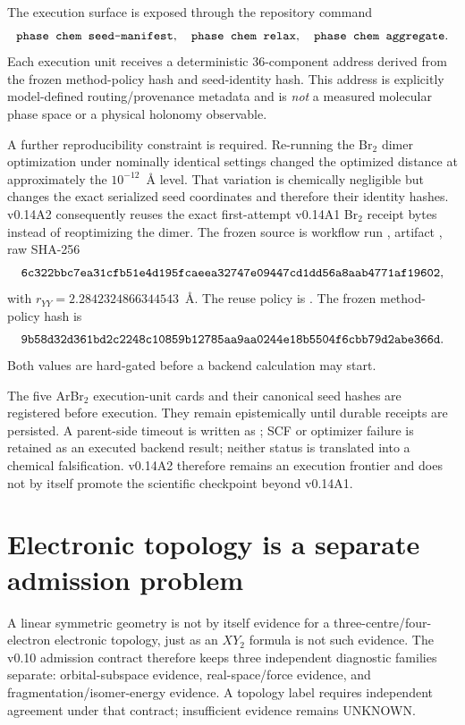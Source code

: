 The execution surface is exposed through the repository command
\begin{equation}
\texttt{phase\ chem\ seed-manifest},\quad
\texttt{phase\ chem\ relax},\quad
\texttt{phase\ chem\ aggregate}.
\end{equation}
Each execution unit receives a deterministic 36-component address derived from the frozen method-policy hash and seed-identity hash.  This address is explicitly model-defined routing/provenance metadata and is \emph{not} a measured molecular phase space or a physical holonomy observable.

A further reproducibility constraint is required.  Re-running the Br$_2$ dimer optimization under nominally identical settings changed the optimized distance at approximately the $10^{-12}$~\AA{} level.  That variation is chemically negligible but changes the exact serialized seed coordinates and therefore their identity hashes.  v0.14A2 consequently reuses the exact first-attempt v0.14A1 Br$_2$ receipt bytes instead of reoptimizing the dimer.  The frozen source is workflow run , artifact , raw  SHA-256
\begin{equation}
\texttt{6c322bbc7ea31cfb51e4d195fcaeea32747e09447cd1dd56a8aab4771af19602},
\end{equation}
with $r_{YY}=2.2842324866344543$~\AA{}.  The reuse policy is .  The frozen method-policy hash is
\begin{equation}
\texttt{9b58d32d361bd2c2248c10859b12785aa9aa0244e18b5504f6cbb79d2abe366d}.
\end{equation}
Both values are hard-gated before a backend calculation may start.

The five ArBr$_2$ execution-unit cards and their canonical seed hashes are registered before execution.  They remain epistemically  until durable receipts are persisted.  A parent-side timeout is written as ; SCF or optimizer failure is retained as an executed backend result; neither status is translated into a chemical falsification.  v0.14A2 therefore remains an execution frontier and does not by itself promote the scientific checkpoint beyond v0.14A1.

\section{Electronic topology is a separate admission problem}
A linear symmetric geometry is not by itself evidence for a three-centre/four-electron electronic topology, just as an $XY_2$ formula is not such evidence.  The v0.10 admission contract therefore keeps three independent diagnostic families separate: orbital-subspace evidence, real-space/force evidence, and fragmentation/isomer-energy evidence.  A topology label requires independent agreement under that contract; insufficient evidence remains UNKNOWN.

